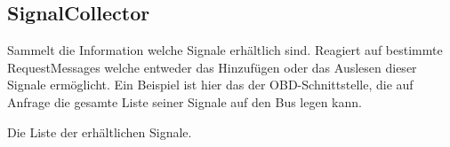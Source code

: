 \documentclass[entwurf.tex]{subfiles}
\begin{document}
		\subsection{SignalCollector}
		\label{Class:SignalCollector}
			Sammelt die Information welche Signale erhältlich sind. Reagiert auf bestimmte RequestMessages welche entweder das Hinzufügen oder das Auslesen dieser Signale ermöglicht. Ein Beispiel ist hier das der OBD-Schnittstelle, die auf Anfrage die gesamte Liste seiner Signale auf den Bus legen kann.
			\begin{description}
					Die Liste der erhältlichen Signale.
			\end{description}
\end{document}
